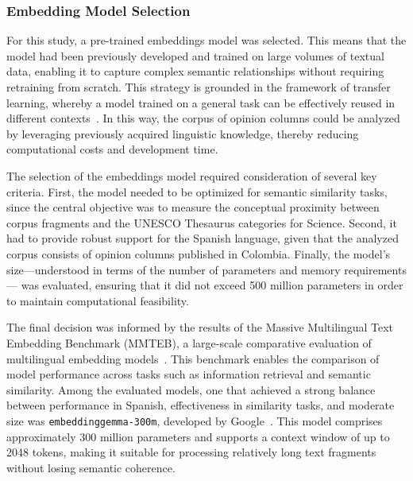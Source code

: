 \documentclass[pdflatex,sn-mathphys-num,iicol]{sn-jnl}
\begin{document}
	
	\subsubsection{Embedding Model Selection}\label{subsubsec:embedding}
	
	For this study, a pre-trained embeddings model was selected. This means that the model had been previously developed and trained on large volumes of textual data, enabling it to capture complex semantic relationships without requiring retraining from scratch. This strategy is grounded in the framework of transfer learning, whereby a model trained on a general task can be effectively reused in different contexts~\cite{Hosna2022}. In this way, the corpus of opinion columns could be analyzed by leveraging previously acquired linguistic knowledge, thereby reducing computational costs and development time.
	
	
	The selection of the embeddings model required consideration of several key criteria. First, the model needed to be optimized for semantic similarity tasks, since the central objective was to measure the conceptual proximity between corpus fragments and the UNESCO Thesaurus categories for Science. Second, it had to provide robust support for the Spanish language, given that the analyzed corpus consists of opinion columns published in Colombia. Finally, the model's size—understood in terms of the number of parameters and memory requirements— was evaluated, ensuring that it did not exceed 500 million parameters in order to maintain computational feasibility.

	
	The final decision was informed by the results of the Massive Multilingual Text Embedding Benchmark (MMTEB), a large-scale comparative evaluation of multilingual embedding models~\cite{enevoldsen2025mmtebmassivemultilingualtext}. This benchmark enables the comparison of model performance across tasks such as information retrieval and semantic similarity. Among the evaluated models, one that achieved a strong balance between performance in Spanish, effectiveness in similarity tasks, and moderate size was \texttt{embeddinggemma-300m}, developed by Google~\cite{vera2025embeddinggemmapowerfullightweighttext}. This model comprises approximately 300 million parameters and supports a context window of up to 2048 tokens, making it suitable for processing relatively long text fragments without losing semantic coherence.
	
\end{document}
